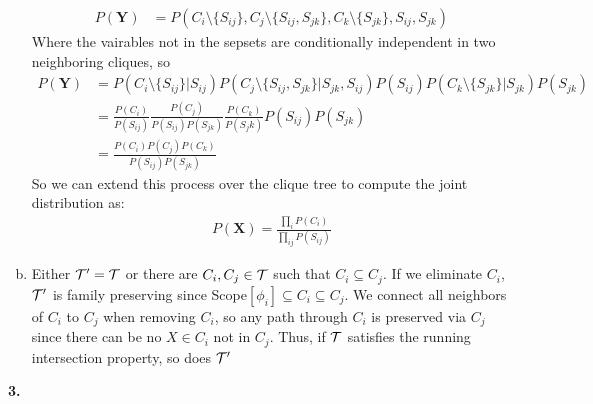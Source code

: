 \documentclass{article}
\begin{document}
\begin{enumerate}[(a)]
\begin{align*}
        P(\mathbf{Y}) &= P(C_i \setminus \{S_{ij}\}, C_j \setminus \{S_{ij}, S_{jk}\}, C_k \setminus \{S_{jk}\}, S_{ij}, S_{jk})
    \end{align*}
    Where the vairables not in the sepsets are conditionally independent in two neighboring cliques, so 
    \begin{align*}
        P(\mathbf{Y}) &= P(C_i \setminus \{S_{ij}\} | S_{ij}) P(C_j \setminus \{S_{ij}, S_{jk}\}| S_{jk},S_{ij})P(S_{ij}) P(C_k \setminus \{S_{jk}\} | S_{jk})P(S_{jk}) \\[0.5ex]
        &= \frac{P(C_i)}{P(S_{ij})}\frac{P(C_j)}{P(S_{ij})P(S_{jk})}\frac{P(C_k)}{P(S_jk)}P(S_{ij})P(S_{jk}) \\[1.0ex]
        &= \frac{P(C_i) P(C_j)P(C_k)}{P(S_{ij})P(S_{jk})}
    \end{align*}
    So we can extend this process over the clique tree to compute the joint distribution as: \begin{align*}
        P(\mathbf{X}) = \frac{\prod_{i}P(C_i)}{\prod_{ij}P(S_{ij})}
    \end{align*}
    \item Either $\cal{T}' = \cal{T}$ or there are $C_i, C_j \in \cal{T}$ such that $C_i \subseteq C_j$. If we eliminate $C_i$, $\cal{T}'$ is family preserving since Scope$[\phi_i] \subseteq C_i \subseteq C_j$. We connect all neighbors of $C_i$ to $C_j$ when removing $C_i$, so any path through $C_i$ is preserved via $C_j$ since there can be no $X \in C_i$ not in $C_j$. Thus, if $\cal{T}$ satisfies the running intersection property, so does $\cal{T}'$
\end{enumerate}
\textbf{3.} 
\end{document}
